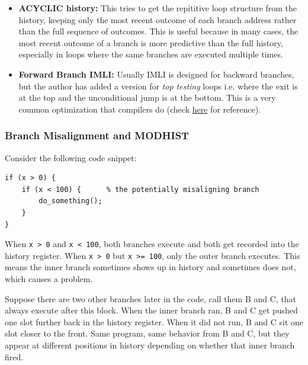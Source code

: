 \documentclass[11pt,a4paper]{article}
\begin{document}
\begin{itemize}
        MPP goes one step further, it only shifts a new region into the history when you cross into a new region. So if five consecutive branches are all within the same 256-byte chunk, only one entry gets recorded. 
        You're tracking region transitions, not individual branches. This naturally compresses long sequences of nearby branches into a compact history
        \item \textbf{ACYCLIC history: }This tries to get the repititive loop structure from the history, keeping only the most recent outcome of each branch address rather than the full sequence of outcomes.
        This is useful because in many cases, the most recent outcome of a branch is more predictive than the full history, especially in loops where the same branches are executed multiple times.

        \item \textbf{Forward Branch IMLI: }Usually IMLI is designed for backward branches, but the author has added a version for \textit{top testing} loops i.e. where the exit is at the top and the unconditional jump
        is at the bottom. This is a very common optimization that compilers do (check \href{http://www.terraterra.ch/modula-2/sb-m2-v4.html}{here} for reference). 
\end{itemize}

\subsubsection{Branch Misalignment and MODHIST}

Consider the following code snippet:

\begin{lstlisting}
if (x > 0) {
    if (x < 100) {      % the potentially misaligning branch
        do_something();
    }
}
\end{lstlisting}

When \texttt{x > 0} and \texttt{x < 100}, both branches execute and both get recorded into the history register. When \texttt{x > 0} but \texttt{x >= 100}, only the outer branch executes. This means the inner branch sometimes shows up 
in history and sometimes does not, which causes a problem.

Suppose there are two other branches later in the code, call them B and C, 
that always execute after this block. When the inner branch ran, B and C get pushed one slot further back in the history register. When it did not run, B and C sit one slot closer to the front. Same program, same behavior from B and C, 
but they appear at different positions in history depending on whether that inner branch fired.
\end{document}
